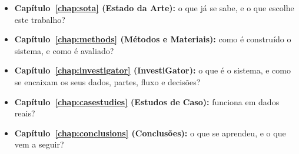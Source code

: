 \begin{itemize}
  \item \textbf{Capítulo~\ref{chap:sota} (Estado da Arte):} o que já se sabe, e o que escolhe este trabalho?
  \item \textbf{Capítulo~\ref{chap:methods} (Métodos e Materiais):} como é construído o sistema, e como é
        avaliado?
  \item \textbf{Capítulo~\ref{chap:investigator} (InvestiGator):} o que é o sistema, e como se encaixam os
        seus dados, partes, fluxo e decisões?
  \item \textbf{Capítulo~\ref{chap:casestudies} (Estudos de Caso):} funciona em dados reais?
  \item \textbf{Capítulo~\ref{chap:conclusions} (Conclusões):} o que se aprendeu, e o que vem a seguir?
\end{itemize}
